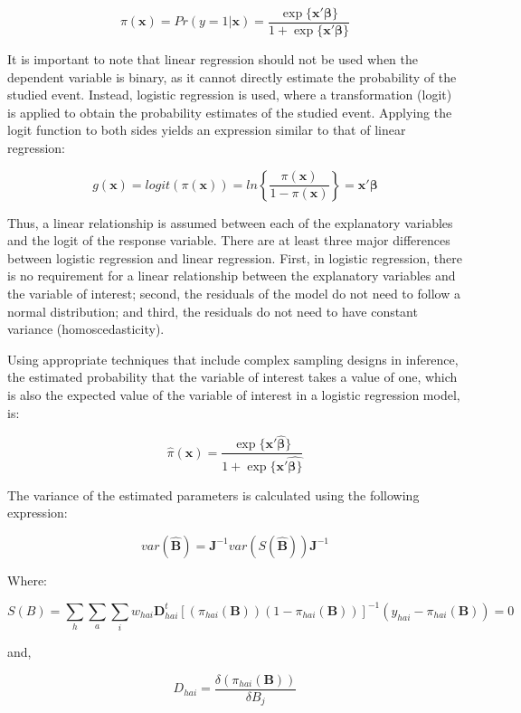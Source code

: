\documentclass[
  12pt,
]{book}
\begin{document}
\[
\pi(\textbf{x})= Pr(y = 1 | \textbf{x}) = \frac{\exp\{\textbf{x}'\boldsymbol{\beta}\}}{1+\exp\{\textbf{x}'\boldsymbol{\beta}\}}
\]

It is important to note that linear regression should not be used when the dependent variable is binary, as it cannot directly estimate the probability of the studied event. Instead, logistic regression is used, where a transformation (logit) is applied to obtain the probability estimates of the studied event. Applying the logit function to both sides yields an expression similar to that of linear regression:

\[
g(\textbf{x})=logit(\pi(\textbf{x}))=ln \left\{ \frac{\pi(\textbf{x})}{1-\pi(\textbf{x})} \right \}= \textbf{x}'\boldsymbol{\beta}
\]

Thus, a linear relationship is assumed between each of the explanatory variables and the logit of the response variable. There are at least three major differences between logistic regression and linear regression. First, in logistic regression, there is no requirement for a linear relationship between the explanatory variables and the variable of interest; second, the residuals of the model do not need to follow a normal distribution; and third, the residuals do not need to have constant variance (homoscedasticity).

Using appropriate techniques that include complex sampling designs in inference, the estimated probability that the variable of interest takes a value of one, which is also the expected value of the variable of interest in a logistic regression model, is:

\[
\hat{\pi}(\textbf{x})= \frac{\exp\{\textbf{x}'\hat{\boldsymbol{\beta}}\}}{1+\exp\{\textbf{x}'\hat{\boldsymbol{\beta}\}}}
\]

The variance of the estimated parameters is calculated using the following expression:

\[
var\left(\boldsymbol{\hat{B}}\right)=\boldsymbol{J}^{-1}var\left(S\left(\hat{\boldsymbol{B}}\right)\right)\boldsymbol{J}^{-1}
\]

Where:

\[
S\left(B\right)=\sum_{h}\sum_{a}\sum_{i}w_{hai}\boldsymbol{D}_{hai}^{t}\left[\left(\pi_{hai}\left(\boldsymbol{B}\right)\right)\left(1-\pi_{hai}\left(\boldsymbol{B}\right)\right)\right]^{-1}\left(y_{hai}-\pi_{hai}\left(\boldsymbol{B}\right)\right)=0
\]

and,

\[
D_{hai} = \frac{\delta\left(\pi_{hai}\left(\boldsymbol{B}\right)\right)}{\delta B_{j}}
\]
\end{document}
